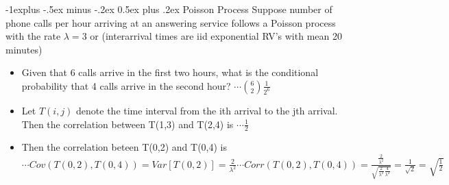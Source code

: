 \documentclass[10pt,landscape]{article}
\makeatletter
\renewcommand{\subsection}{\@startsection{subsection}{2}{0mm}%
                                {-1explus -.5ex minus -.2ex}%
                                {0.5ex plus .2ex}%
                                {\normalfont\normalsize\bfseries}}
\makeatother
\begin{document}
\begin{multicols}{3}
\subsection{Poisson Process}
Suppose number of phone calls per hour arriving at an answering service follows a Poisson process with the rate $\lambda = 3$ or (interarrival times are iid exponential RV's with mean 20 minutes)
\begin{itemize}[noitemsep]
  \item Given that 6 calls arrive in the first two hours, what is the conditional probability that 4 calls arrive in the second hour? $\cdots \binom{6}{2} \frac{1}{2^{6}}$
  \item Let $T(i,j)$ denote the time interval from the ith arrival to the jth arrival. Then the correlation between T(1,3) and T(2,4) is $\cdots \frac{1}{2}$
  \item Then the correlation beteen T(0,2) and T(0,4) is $\cdots Cov(T(0,2), T(0,4)) = Var[T(0,2)] = \frac{2}{\lambda^{2}} \cdots Corr(T(0,2), T(0,4)) = \frac{\frac{2}{\lambda^{2}}}{\sqrt{\frac{2}{\lambda^{2}}\frac{4}{\lambda^{2}}}} = \frac{1}{\sqrt{2}} = \sqrt{\frac{1}{2}}$
\end{itemize}


\end{multicols}
\end{document}
